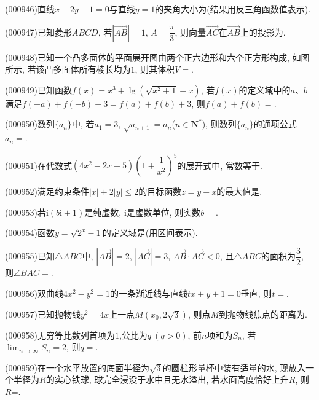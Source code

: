 \item (000946)直线$x+2y-1=0$与直线$y=1$的夹角大小为(结果用反三角函数值表示).
\item (000947)已知菱形$ABCD$, 若$|\overrightarrow{AB}|=1$, $A=\dfrac\pi 3$, 则向量$\overrightarrow{AC}$在$\overrightarrow{AB}$上的投影为.
\item (000948)已知一个凸多面体的平面展开图由两个正六边形和六个正方形构成, 如图所示, 若该凸多面体所有棱长均为$1$, 则其体积$V=$.
\begin{center}
\end{center}
\item (000949)已知函数$f(x)={x^3}+\lg (\sqrt{x^2+1}+x)$, 若$f(x)$的定义域中的$a$、$b$满足$f(-a)+f(-b)-3=f(a)+f(b)+3$, 则$f(a)+f(b)=$.
\item (000950)数列$\{a_n\}$中, 若$a_1=3$, $\sqrt{a_{n+1}}=a_n$($n\in \mathbf{N}^*$), 则数列$\{a_n\}$的通项公式$a_n=$.
\item (000951)在代数式$(4x^2-2x-5)(1+\dfrac1{x^2})^5$的展开式中, 常数等于.
\item (000952)满足约束条件$|x|+2|y|\le 2 $的目标函数$z=y-x$的最大值是.
\item (000953)若$\mathrm{i}(b\mathrm{i}+1)$是纯虚数, $\mathrm{i}$是虚数单位, 则实数$b=$.
\item (000954)函数$y=\sqrt{2^x-1}$的定义域是(用区间表示).
\item (000955)已知$\triangle ABC$中, $|\overrightarrow{AB}|=2 $,  $|\overrightarrow{AC}|=3 $, $\overrightarrow{AB}\cdot \overrightarrow{AC}<0$, 且$\triangle ABC$的面积为$\dfrac32$, 则$\angle BAC=$.
\item (000956)双曲线$4 x^2-y^2=1$的一条渐近线与直线$tx+y+1=0$垂直, 则$t=$.
\item (000957)已知抛物线$y^2=4x$上一点$M(x_0,2 \sqrt3)$, 则点$M$到抛物线焦点的距离为.
\item (000958)无穷等比数列首项为$1$,公比为$q \ (q>0)$, 前$n$项和为$S_n$, 若$\displaystyle\lim_{n\to\infty}S_n=2$, 则$q=$.
\item (000959)在一个水平放置的底面半径为$\sqrt 3$的圆柱形量杯中装有适量的水, 现放入一个半径为$R$的实心铁球, 球完全浸没于水中且无水溢出, 若水面高度恰好上升$R$, 则$R$=.
